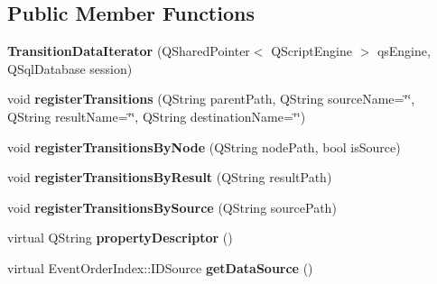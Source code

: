\subsection*{Public Member Functions}
\begin{DoxyCompactItemize}
\item 
\hypertarget{class_picto_1_1_transition_data_iterator_a20c7449eb078c217715f93250bafc4d9}{{\bfseries Transition\-Data\-Iterator} (Q\-Shared\-Pointer$<$ Q\-Script\-Engine $>$ qs\-Engine, Q\-Sql\-Database session)}\label{class_picto_1_1_transition_data_iterator_a20c7449eb078c217715f93250bafc4d9}

\item 
\hypertarget{class_picto_1_1_transition_data_iterator_a8b24b24f14a0abb16aec3aa92a9b586e}{void {\bfseries register\-Transitions} (Q\-String parent\-Path, Q\-String source\-Name=\char`\"{}\char`\"{}, Q\-String result\-Name=\char`\"{}\char`\"{}, Q\-String destination\-Name=\char`\"{}\char`\"{})}\label{class_picto_1_1_transition_data_iterator_a8b24b24f14a0abb16aec3aa92a9b586e}

\item 
\hypertarget{class_picto_1_1_transition_data_iterator_ac6ce4538c9e4f8f181e53dbb9a1ebcd7}{void {\bfseries register\-Transitions\-By\-Node} (Q\-String node\-Path, bool is\-Source)}\label{class_picto_1_1_transition_data_iterator_ac6ce4538c9e4f8f181e53dbb9a1ebcd7}

\item 
\hypertarget{class_picto_1_1_transition_data_iterator_a3352e6a8718f7c23c0b8dad662cb1850}{void {\bfseries register\-Transitions\-By\-Result} (Q\-String result\-Path)}\label{class_picto_1_1_transition_data_iterator_a3352e6a8718f7c23c0b8dad662cb1850}

\item 
\hypertarget{class_picto_1_1_transition_data_iterator_aa33818a3d9cd4e969cd9a50162a3151e}{void {\bfseries register\-Transitions\-By\-Source} (Q\-String source\-Path)}\label{class_picto_1_1_transition_data_iterator_aa33818a3d9cd4e969cd9a50162a3151e}

\item 
\hypertarget{class_picto_1_1_transition_data_iterator_a4b9ecdb7d073653f0e3af0c128b978d6}{virtual Q\-String {\bfseries property\-Descriptor} ()}\label{class_picto_1_1_transition_data_iterator_a4b9ecdb7d073653f0e3af0c128b978d6}

\item 
\hypertarget{class_picto_1_1_transition_data_iterator_a2f7c583680d0b098c9b3535a0b2bd80a}{virtual Event\-Order\-Index\-::\-I\-D\-Source {\bfseries get\-Data\-Source} ()}\label{class_picto_1_1_transition_data_iterator_a2f7c583680d0b098c9b3535a0b2bd80a}

\end{DoxyCompactItemize}
